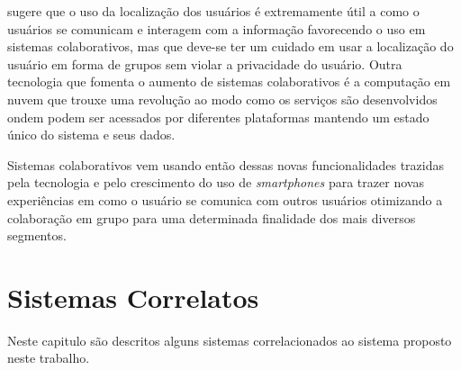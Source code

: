 \documentclass[	12pt, Times, openright, twoside, a4paper, english, brazil]{abntex2}
\begin{document}
\cite{Konomi:2011:BMC:2030100.2030106} sugere que o uso da localização dos usuários é extremamente útil a como o usuários se comunicam e interagem com a informação favorecendo o uso em sistemas colaborativos, mas que deve-se ter um cuidado em usar a localização do usuário em forma de grupos sem violar a privacidade do usuário. Outra tecnologia que fomenta o aumento de sistemas colaborativos é a computação em nuvem que trouxe uma revolução ao modo como os serviços são desenvolvidos ondem podem ser acessados por diferentes plataformas mantendo um estado único do sistema e seus dados.

Sistemas colaborativos vem usando então dessas novas funcionalidades trazidas pela tecnologia e pelo crescimento do uso de \textit{smartphones} para trazer novas experiências em como o usuário se comunica com outros usuários otimizando a colaboração em grupo para uma determinada finalidade dos mais diversos segmentos.







\chapter{Sistemas Correlatos}
\label{chapter:correlatos}
Neste capitulo são descritos alguns sistemas correlacionados ao sistema proposto neste trabalho.
\end{document}
